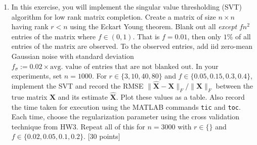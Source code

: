 \documentclass[11pt]{article}
\begin{document}
\begin{enumerate}
\item In this exercise, you will implement the singular value thresholding (SVT) algorithm for low rank matrix completion. Create a matrix of size $n \times n$ having rank $r < n$ using the Eckart Young theorem. Blank out all \emph{except} $fn^2$ entries of the matrix where $f \in (0,1)$. That is $f = 0.01$, then only $1\%$ of all entries of the matrix are observed. To the observed entries, add iid zero-mean Gaussian noise with standard deviation $f_{\sigma} := 0.02 \times \text{avg. value of entries that are not blanked out}$. In your experiments, set $n = 1000$. For $r \in \{3, 10,40,80\}$ and $f \in \{0.05, 0.15, 0.3, 0.4\}$, implement the SVT and record the RMSE $\|\boldsymbol{\hat{X}}-\boldsymbol{X}\|_F/\|\boldsymbol{X}\|_F$ between the true matrix $\boldsymbol{X}$ and its estimate $\boldsymbol{\hat{X}}$. Plot these values as a table. Also record the time taken for execution using the MATLAB commands \texttt{tic} and \texttt{toc}. Each time, choose the regularization parameter using the cross validation technique from HW3. Repeat all of this for $n = 3000$ with $r \in \{\}$ and $f \in \{0.02,0.05, 0.1, 0.2\}$. \textsf{[30 points]}

\end{enumerate}
\end{document}
